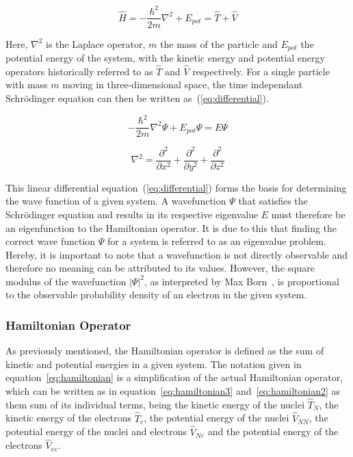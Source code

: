 \documentclass[12pt]{article}
\begin{document}
\begin{equation}
  \hat{H} = -\frac{\hbar^2}{2m}\nabla^2 + E_{pot} = \hat{T} + \hat{V}
  \label{eq:hamiltonian}
\end{equation}

\bigskip

\noindent Here, $\nabla^2$ is the Laplace operator, $m$ the mass of the particle and $E_{pot}$ the potential energy of the system, with the kinetic energy and potential energy operators historically referred to as $\hat{T}$ and $\hat{V}$ respectively.
For a single particle with mass $m$ moving in three-dimensional space, the time independant Schrödinger equation can then be written as~(\ref{eq:differential}).

\begin{equation}
  -\frac{\hbar^2}{2m}\nabla^2\Psi + E_{pot}\Psi = E\Psi
  \label{eq:differential}
\end{equation}

\begin{equation*}
  \nabla^2 = \frac{\partial^2}{\partial x^2} + \frac{\partial^2}{\partial y^2} + \frac{\partial^2}{\partial z^2}
\end{equation*}

\bigskip

\noindent This linear differential equation~(\ref{eq:differential}) forms the basis for determining the wave function of a given system. 
A wavefunction $\Psi$ that satisfies the Schrödinger equation and results in its respective eigenvalue $E$ must therefore be an eigenfunction to the Hamiltonian operator.
It is due to this that finding the correct wave function $\Psi$ for a system is referred to as an eigenvalue problem.\\
Hereby, it is important to note that a wavefunction is not directly observable and therefore no meaning can be attributed to its values.
However, the square modulus of the wavefunction $|\Psi|^2$, as interpreted by Max Born~\cite{Born1926}, is proportional to the observable probability density of an electron in the given system.

\subsubsection{Hamiltonian Operator}
As previously mentioned, the Hamiltonian operator is defined as the sum of kinetic and potential energies in a given system. 
The notation given in equation~\ref{eq:hamiltonian} is a simplification of the actual Hamiltonian operator, which can be written as in equation~\ref{eq:hamiltonian3} and~\ref{eq:hamiltonian2} as them sum of its individual terms, being the kinetic energy of the nuclei $\hat{T}_N$, the kinetic energy of the electrons $\hat{T}_e$, the potential energy of the nuclei $\hat{V}_{NN}$, the potential energy of the nuclei and electrons $\hat{V}_{Ne}$ and the potential energy of the electrons $\hat{V}_{ee}$.
\end{document}
